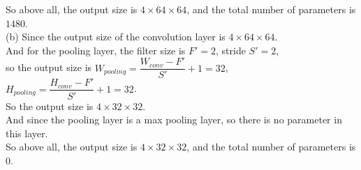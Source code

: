\documentclass[10pt]{article}
\begin{document}
\begin{enumerate}[1.]
So above all, the output size is $4\times 64\times 64$, and the total number of parameters is $1480$.\\

(b) Since the output size of the convolution layer is $4\times 64\times 64$.\\
And for the pooling layer, the filter size is $F' = 2$, stride $S'=2$,\\
so the output size is $W_{pooling}=\dfrac{W_{conv}-F'}{S'}+1=32$, $H_{pooling}=\dfrac{H_{conv}-F'}{S'}+1=32$.\\
So the output size is $4\times 32\times 32$.\\

And since the pooling layer is a max pooling layer, so there is no parameter in this layer.\\

So above all, the output size is $4\times 32\times 32$, and the total number of parameters is $0$.\\
	
	\newpage
	

\end{enumerate}
\end{document}
